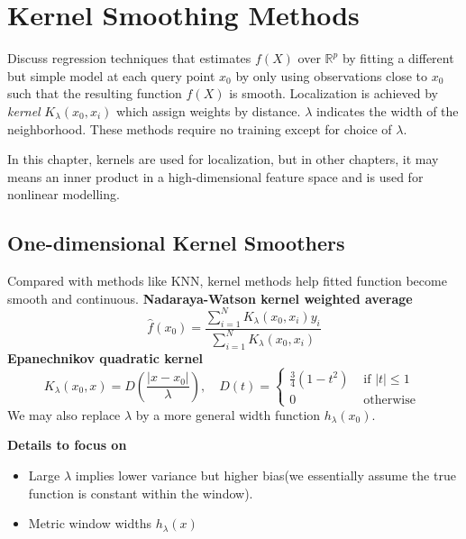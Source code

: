 \chapter{Kernel Smoothing Methods}
Discuss regression techniques that estimates $f(X)$ over $\mathbb{R}^p$ by fitting a different
but simple model at each query point $x_0$ by only using observations close to $x_0$ such that
the resulting function $\hat{f}(X)$ is smooth. Localization is achieved by \textit{kernel} 
$K_{\lambda}(x_0,x_i)$ which assign weights by distance. $\lambda$ indicates the width of the
neighborhood. These methods require no training except for choice of $\lambda$. 

In this chapter, kernels are used for localization, but in other chapters, it may means an 
inner product in a high-dimensional feature space and is used for nonlinear modelling. 

\section{One-dimensional Kernel Smoothers}
Compared with methods like KNN, kernel methods help fitted function become smooth and continuous. 
\noindent\textbf{Nadaraya-Watson kernel weighted average}
\begin{equation*}
    \hat{f}\left(x_{0}\right)=\frac{\sum_{i=1}^{N} K_{\lambda}\left(x_{0}, x_{i}\right) 
    y_{i}}{\sum_{i=1}^{N} K_{\lambda}\left(x_{0}, x_{i}\right)}
\end{equation*}
\noindent\textbf{Epanechnikov quadratic kernel}
\begin{equation*}
    K_{\lambda}\left(x_{0}, x\right)=D\left(\frac{\left|x-x_{0}\right|}{\lambda}\right),\quad
D(t)=\left\{\begin{array}{ll}{\frac{3}{4}\left(1-t^{2}\right)} & {\text { if }|t| \leq 1} \\ 
{0} & {\text { otherwise }}\end{array}\right.
\end{equation*}
We may also replace $\lambda$ by a more general width function $h_{\lambda}(x_0)$. 

\noindent\textbf{Details to focus on}
\begin{itemize}
\item Large $\lambda$ implies lower variance but higher bias(we essentially assume
the true function is constant within the window). 
\item Metric window widths $h_\lambda(x)$
\end{itemize}


